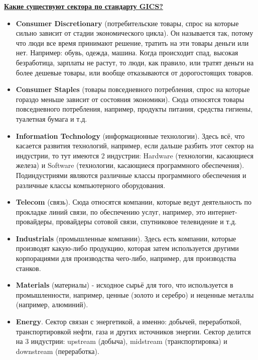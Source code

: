 \documentclass{article}
\begin{document}
	\underline{\textbf{Какие существуют сектора по стандарту GICS?}}
	\begin{itemize}
		
	\item \textbf{Consumer Discretionary} (потребительские товары, спрос на которые сильно зависит от стадии экономического цикла). Он называется так, потому что люди все время принимают решение, тратить на эти товары деньги или нет. Например: обувь, одежда, машина. Когда происходит спад, высокая безработица, зарплаты не растут, то люди, как правило, или тратят деньги на более дешевые товары, или вообще отказываются от дорогостоящих товаров.
	
	\item \textbf{Consumer Staples} (товары повседневного потребления, спрос на которые гораздо меньше зависит от состояния экономики). Сюда относятся товары повседневного потребления, например, продукты питания, средства гигиены, туалетная бумага и т.д.
	
	\item \textbf{Information Technology} (информационные технологии). Здесь всё, что касается развития технологий, например, если дальше разбить этот сектор на индустрии, то тут имеются 2 индустрии: Hardware (технологии, касающиеся железа) и Software (технологии, касающиеся программного обеспечения). Подиндустриями являются различные классы программного обеспечения и различные классы компьютерного оборудования.
	
	\item \textbf{Telecom} (связь). Сюда относятся компании, которые ведут деятельность по прокладке линий связи, по обеспечению услуг, например, это интернет-провайдеры, провайдеры сотовой связи, спутниковое телевидение и т.д.
	
	\item \textbf{Industrials} (промышленные компании). Здесь есть компании, которые производят какую-либо продукцию, которая затем используется другими корпорациями для производства чего-либо, например, для производства станков.
	
	\item \textbf{Materials} (материалы) - исходное сырьё для того, что используется в промышленности, например, ценные (золото и серебро) и неценные металлы (например, алюминий).
	
	\item \textbf{Energy}. Сектор связан с энергетикой, а именно: добычей, переработкой, транспортировкой нефти, газа и других источников энергии. Сектор делится на 3 индустрии: upstream (добыча), midstream (транспортировка) и downstream (переработка).
	

\end{itemize}
\end{document}
